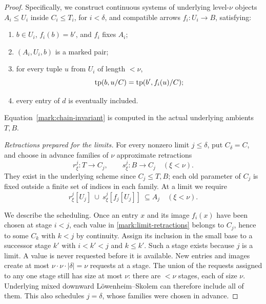 \begin{proof}
Specifically, we construct continuous systems of underlying
level-\(\nu\) objects \(A_i\leq U_i\) inside
\(C_i\leq T_i\), for \(i<\delta\), and compatible
arrows \(f_i:U_i\to B\), satisfying:
\begin{enumerate}
\item \(b\in U_i\), \(f_i(b)=b'\), and \(f_i\)
fixes \(A_i\);
\item \((A_i,U_i,b)\) is a marked pair;
\item for every tuple \(u\) from \(U_i\) of
length \(<\nu\),
\begin{equation}
                 \operatorname{tp}(b,u/C)
                    =\operatorname{tp}(b',f_i(u)/C);
                 \label{mark:chain-invariant}
\end{equation}
\item every entry of \(d\) is eventually included.
\end{enumerate}
Equation~\eqref{mark:chain-invariant} is computed
in the actual underlying ambients \(T,B\).

\par\medskip\noindent\textit{Retractions prepared for the limits.}\quad
For every nonzero limit \(j\leq\delta\), put
\(C_\delta=C\), and choose in advance families
of \(\nu\) approximate retractions
\begin{equation}
          r^j_\xi:T\to C_j,\qquad
          s^j_\xi:B\to C_j
                    \quad(\xi<\nu).
          \label{mark:limit-retractions}
\end{equation}
They exist in the underlying scheme since
\(C_j\leq T,B\); each old parameter of \(C_j\)
is fixed outside a finite set of indices in
each family.  At a limit we require
\begin{equation}
        r^j_\xi[U_j]\ \cup\
        s^j_\xi[f_j[U_j]]\ \subseteq A_j
                    \quad(\xi<\nu).
        \label{mark:limit-closure}
\end{equation}

We describe the scheduling.  Once an entry
\(x\) and its image \(f_i(x)\) have been
chosen at stage \(i<j\), each value in
\eqref{mark:limit-retractions} belongs to
\(C_j\), hence to some \(C_k\) with \(k<j\)
by continuity.  Assign its inclusion in the
small base to a successor stage \(k'\) with
\(i<k'<j\) and \(k\leq k'\).  Such a stage
exists because \(j\) is a limit.  A value
is never requested before it is available.
New entries and images create at most
\(\nu\cdot\nu\cdot|\delta|=\nu\) requests
at a stage.  The union of the requests
assigned to any one stage still has size
at most \(\nu\): there are \(<\nu\)
stages, each of size \(\nu\).  Underlying
mixed downward Löwenheim--Skolem can
therefore include all of them.  This
also schedules \(j=\delta\), whose
families were chosen in advance.


\end{proof}

